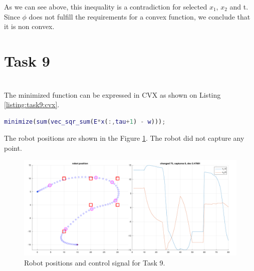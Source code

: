 As we can see above, this inequality is a contradiction for selected $x_{1}$, $x_{2}$ and t. Since $\phi$ does not fulfill the requirements for a convex function, we conclude that it is non convex.

\section {Task 9}
\noindent{}\\

The minimized function can be expressed in CVX as shown on Listing \ref{listing:task9:cvx}.

\begin{lstlisting}[language=Matlab, caption=CVX code for task 9., label=listing:task9:cvx]
minimize(sum(vec_sqr_sum(E*x(:,tau+1) - w)));
\end{lstlisting}

The robot positions are shown in the Figure \ref{fig:task9:graph}. The robot did not capture any point.

\begin{figure}[!htb]
    \caption{Robot positions and control signal for Task 9.}
    \label{fig:task9:graph}
    \centering    
    \includegraphics[width=1\linewidth]{part1/figures/task_9.pdf}
\end{figure}

